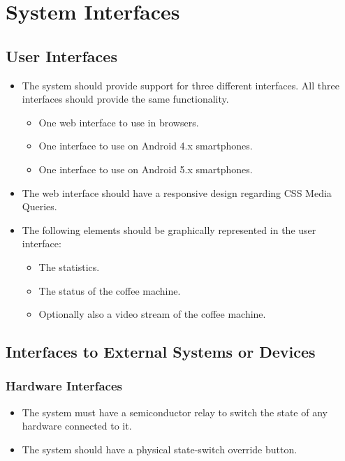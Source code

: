 \newpage
\section{System Interfaces}

\subsection{User Interfaces}

\begin{itemize}
\item The system should provide support for three different interfaces. All three interfaces should provide the same functionality.
  \begin{itemize}
  \item One web interface to use in browsers.
  \item One interface to use on Android 4.x smartphones.
  \item One interface to use on Android 5.x smartphones.
  \end{itemize}

\item The web interface should have a responsive design regarding CSS Media Queries.

\item The following elements should be graphically represented in the user interface:
  \begin{itemize}
  \item The statistics.
  \item The status of the coffee machine.
  \item Optionally also a video stream of the coffee machine.
  \end{itemize}
\end{itemize}

\subsection{Interfaces to External Systems or Devices}

\subsubsection{Hardware Interfaces}

\begin{itemize}
\item The system must have a semiconductor relay to switch the state of any hardware connected to it.
\item The system should have a physical state-switch override button.
\end{itemize}

